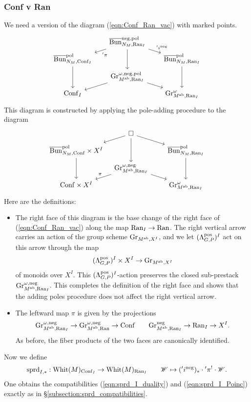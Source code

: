 \subsubsection{Conf v Ran} We need a version of the diagram (\ref{eqn:Conf_Ran_vac}) with marked points.
\[
\begin{tikzcd}[
  column sep={8em,between origins},
  row sep={2.5em,between origins}
]
    & \Bunc_{N_M, \Ran_I}^{\neg, \pol} \arrow[dl, "\aph\pi"] \arrow[dr, "\aph i^\neg"] \arrow[dd] & \\
  \Bunc_{N_M, \Conf_I}^{\pol} \arrow[dd] & & \Bunc_{N_M, \Ran_I}^{\pol} \arrow[dd] \\
    & \Gr_{M^\ab, \Ran_I}^{\omega,\neg, \pol} \arrow[dl] \arrow[dr] &  \\
  \Conf_I & & \Gr_{M^\ab, \Ran_I}^\omega
\end{tikzcd}
\]
This diagram is constructed by applying the pole-adding procedure to the diagram
\[
\begin{tikzcd}[
  column sep={8em,between origins},
  row sep={2.5em,between origins}
]
    & \square \arrow[dl] \arrow[dr] \arrow[dd] & \\
  \Bunc_{N_M, \Conf}^\pol \times X^I \arrow[dd] & & \Bunc_{N_M, \Ran_I}^{\pol} \arrow[dd] \\
    & \Gr_{M^\ab, \Ran_I}^{\omega,\neg} \arrow[dl, "\pi" above left] \arrow[dr] &  \\
  \Conf \times X^I & & \Gr^\omega_{M^\ab, \Ran_I}
\end{tikzcd}
\]
Here are the definitions:
\begin{itemize}
    \item The right face of this diagram is the base change of the right face of (\ref{eqn:Conf_Ran_vac}) along the map $\mathrm{Ran}_I \to \mathrm{Ran}$. The right vertical arrow carries an action of the group scheme $\mathrm{Gr}_{M^{\mathrm{ab}}, X^I}$, and we let $(\Lambda_{G,P}^{\mathrm{pos}})^I$ act on this arrow through the map
      \[(\Lambda_{G,P}^{\mathrm{pos}})^I \times X^I \to \mathrm{Gr}_{M^{\mathrm{ab}}, X^I}\]
    of monoids over $X^I$. This $(\Lambda_{G,P}^{\mathrm{pos}})^I$-action preserves the closed sub-prestack $\mathrm{Gr}_{M^{\mathrm{ab}}, \mathrm{Ran}_I}^{\omega,\mathrm{neg}}$. This completes the definition of the right face and shows that the adding poles procedure does not affect the right vertical arrow.
    \item The leftward map $\pi$ is given by the projections
      \[
      \mathrm{Gr}_{M^{\mathrm{ab}}, \mathrm{Ran}_I}^{\omega,\mathrm{neg}} \to \mathrm{Gr}_{M^{\mathrm{ab}}, \mathrm{Ran}}^{\omega,\mathrm{neg}} \to \mathrm{Conf}
      \qquad
      \mathrm{Gr}_{M^{\mathrm{ab}}, \mathrm{Ran}_I}^{\mathrm{neg}} \to \mathrm{Ran}_I \to X^I.
      \]
    As before, the fiber products of the two faces are canonically identified.
\end{itemize}
Now we define
    \[
    \mathrm{sprd}_{I,*} : \mathrm{Whit}(M)_{\mathrm{Conf}_I} \to \mathrm{Whit}(M)_{\mathrm{Ran}_I}
    \qquad \mathscr{W} \mapsto ({'} i^{\mathrm{neg}})_* \cdot {'}\pi^! \cdot \mathscr{W}.
    \]
One obtains the compatibilities (\ref{eqn:sprd_I_duality}) and (\ref{eqn:sprd_I_Poinc}) exactly as in \S\ref{subsection:sprd_compatibilities}.